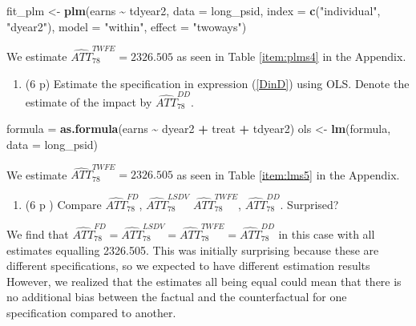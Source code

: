 \documentclass[
]{article}
\newenvironment{Shaded}{\begin{snugshade}}{\end{snugshade}}
\newcommand{\AttributeTok}[1]{\textcolor[rgb]{0.13,0.29,0.53}{#1}}
\newcommand{\FunctionTok}[1]{\textcolor[rgb]{0.13,0.29,0.53}{\textbf{#1}}}
\newcommand{\NormalTok}[1]{#1}
\newcommand{\OtherTok}[1]{\textcolor[rgb]{0.56,0.35,0.01}{#1}}
\newcommand{\SpecialCharTok}[1]{\textcolor[rgb]{0.81,0.36,0.00}{\textbf{#1}}}
\newcommand{\StringTok}[1]{\textcolor[rgb]{0.31,0.60,0.02}{#1}}
\providecommand{\tightlist}{%
  \setlength{\itemsep}{0pt}\setlength{\parskip}{0pt}}
\begin{document}
\begin{Shaded}
\begin{Highlighting}[]
\NormalTok{fit\_plm }\OtherTok{\textless{}{-}} \FunctionTok{plm}\NormalTok{(earns }\SpecialCharTok{\textasciitilde{}}\NormalTok{ tdyear2, }
              \AttributeTok{data =}\NormalTok{ long\_psid, }
              \AttributeTok{index =} \FunctionTok{c}\NormalTok{(}\StringTok{"individual"}\NormalTok{, }\StringTok{"dyear2"}\NormalTok{), }
              \AttributeTok{model =} \StringTok{"within"}\NormalTok{, }
              \AttributeTok{effect =} \StringTok{"twoways"}\NormalTok{)}
\end{Highlighting}
\end{Shaded}

We estimate \(\widehat{ATT}_{78}^{TWFE} = 2326.505\) as seen in Table
\ref{item:plms4} in the Appendix.

\begin{enumerate}
\def\labelenumi{\arabic{enumi}.}
\setcounter{enumi}{4}
\tightlist
\item
  (6 p) Estimate the specification in expression (\ref{DinD}) using OLS.
  Denote the estimate of the impact by
  \(\widehat{ATT}_{78}^{DD}\).\label{item:dd}
\end{enumerate}

\begin{Shaded}
\begin{Highlighting}[]
\NormalTok{formula }\OtherTok{=} \FunctionTok{as.formula}\NormalTok{(earns }\SpecialCharTok{\textasciitilde{}}\NormalTok{ dyear2 }\SpecialCharTok{+}\NormalTok{ treat }\SpecialCharTok{+}\NormalTok{ tdyear2)}
\NormalTok{ols }\OtherTok{\textless{}{-}} \FunctionTok{lm}\NormalTok{(formula, }\AttributeTok{data =}\NormalTok{ long\_psid)}
\end{Highlighting}
\end{Shaded}

We estimate \(\widehat{ATT}_{78}^{TWFE} = 2326.505\) as seen in Table
\ref{item:lms5} in the Appendix.

\begin{enumerate}
\def\labelenumi{\arabic{enumi}.}
\setcounter{enumi}{5}
\tightlist
\item
  (6 p ) Compare \(\widehat{ATT}_{78}^{FD}\),
  \(\widehat{ATT}_{78}^{LSDV}\) \(\widehat{ATT}_{78}^{TWFE}\),
  \(\widehat{ATT}_{78}^{DD}\). Surprised?
\end{enumerate}

We find that
\(\widehat{ATT}_{78}^{FD} = \widehat{ATT}_{78}^{LSDV} = \widehat{ATT}_{78}^{TWFE} = \widehat{ATT}_{78}^{DD}\)
in this case with all estimates equalling 2326.505. This was initially
surprising because these are different specifications, so we expected to
have different estimation results However, we realized that the
estimates all being equal could mean that there is no additional bias
between the factual and the counterfactual for one specification
compared to another.
\end{document}
